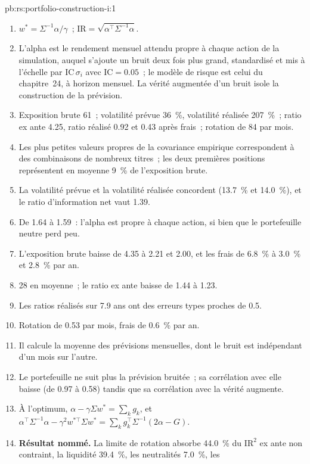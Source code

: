 \begin{solution}{pb:rs:portfolio-construction-i:1}
\begin{enumerate}
\item $w^* = \Sigma^{-1}\alpha/\gamma$~; $\mathrm{IR} = \sqrt{\alpha^\top\Sigma^{-1}\alpha}$.
\item L'alpha est le rendement mensuel attendu propre à chaque action de la simulation, auquel s'ajoute un bruit deux fois plus grand, standardisé et mis à l'échelle par $\mathrm{IC}\,\sigma_i$ avec
$\mathrm{IC} = 0.05$~; le modèle de risque est celui du chapitre~24, à horizon mensuel. La vérité augmentée d'un bruit isole la construction de la prévision.
\item Exposition brute 61~; volatilité prévue 36~\%, volatilité réalisée 207~\%~; ratio ex ante 4.25, ratio réalisé 0.92 et 0.43 après frais~; rotation de 84 par mois.
\item Les plus petites valeurs propres de la covariance empirique correspondent à des combinaisons de nombreux titres~; les deux premières positions représentent en moyenne 9~\% de l'exposition brute.
\item La volatilité prévue et la volatilité réalisée concordent (13.7~\% et 14.0~\%), et le ratio d'information net vaut 1.39.
\item De 1.64 à 1.59~: l'alpha est propre à chaque action, si bien que le portefeuille neutre perd peu.
\item L'exposition brute baisse de 4.35 à 2.21 et 2.00, et les frais de 6.8~\% à 3.0~\% et 2.8~\% par an.
\item 28 en moyenne~; le ratio ex ante baisse de 1.44 à 1.23.
\item Les ratios réalisés sur 7.9 ans ont des erreurs types proches de 0.5.
\item Rotation de 0.53 par mois, frais de 0.6~\% par an.
\item Il calcule la moyenne des prévisions mensuelles, dont le bruit est indépendant d'un mois sur l'autre.
\item Le portefeuille ne suit plus la prévision bruitée~; sa corrélation avec elle baisse (de 0.97 à 0.58) tandis que sa corrélation avec la vérité augmente.
\item À l'optimum, $\alpha - \gamma\Sigma w^* = \sum_k g_k$, et $\alpha^\top\Sigma^{-1}\alpha - \gamma^2 w^{*\top}\Sigma w^* = \sum_k g_k^\top\Sigma^{-1}(2\alpha - G)$.
\item \textbf{Résultat nommé.} La limite de rotation absorbe 44.0~\% du $\mathrm{IR}^2$ ex ante non contraint, la liquidité 39.4~\%, les neutralités 7.0~\%, les 

\end{enumerate}
\end{solution}

